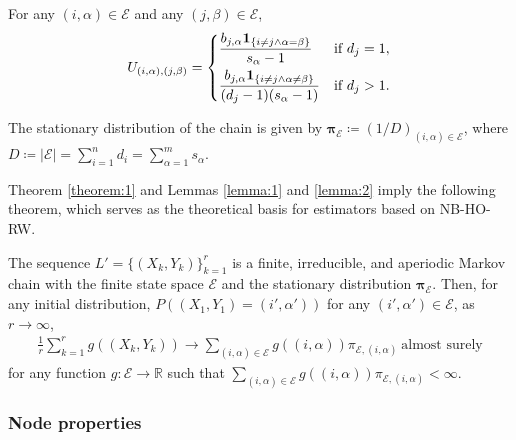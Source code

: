 \begin{lemma}
For any $(i, \alpha) \in \mathcal{E}$ and any $(j, \beta) \in \mathcal{E}$, 
\begin{align*}
U_{(i, \alpha), (j, \beta)} =
\begin{dcases}
\frac{b_{j, \alpha} \bm{1}_{\{i \neq j \land \alpha = \beta\}}}{s_{\alpha} - 1}    &   \text{if $d_j = 1$}, \\
\frac{b_{j, \alpha} \bm{1}_{\{i \neq j \land \alpha \neq \beta\}}}{(d_j-1)(s_{\alpha} - 1)} &   \text{if $d_j > 1$}.
\end{dcases}
\end{align*}
\label{lemma:1}
\end{lemma}

\begin{lemma}
The stationary distribution of the chain is given by  $\bm{\pi}_{\mathcal{E}} \coloneq (1 / D)_{(i, \alpha) \in \mathcal{E}}$, where $D \coloneq |\mathcal{E}| = \sum_{i=1}^n d_i = \sum_{\alpha=1}^m s_{\alpha}$.
\label{lemma:2}
\end{lemma}

Theorem \ref{theorem:1} and Lemmas \ref{lemma:1} and \ref{lemma:2} imply the following theorem, which serves as the theoretical basis for estimators based on NB-HO-RW.
\begin{theorem}
The sequence $L' = \{(X_k, Y_k)\}_{k=1}^{r}$ is a finite, irreducible, and aperiodic Markov chain with the finite state space $\mathcal{E}$ and the stationary distribution $\bm{\pi}_{\mathcal{E}}$. 
Then, for any initial distribution, $P((X_1, Y_1) = (i', \alpha'))$ for any $(i', \alpha') \in \mathcal{E}$, as $r \to \infty$, 
\begin{align*}
\frac{1}{r} \sum_{k=1}^r g((X_k, Y_k)) \to \sum_{(i, \alpha) \in \mathcal{E}} g((i, \alpha)) \pi_{\mathcal{E}, (i, \alpha)}\ \text{almost surely}
\end{align*}
for any function $g: \mathcal{E} \to \mathbb{R}$ such that $\sum_{(i, \alpha) \in \mathcal{E}} g((i, \alpha)) \pi_{\mathcal{E}, (i, \alpha)} < \infty$.
\label{theorem:2}
\end{theorem}

\subsubsection{Node properties}

